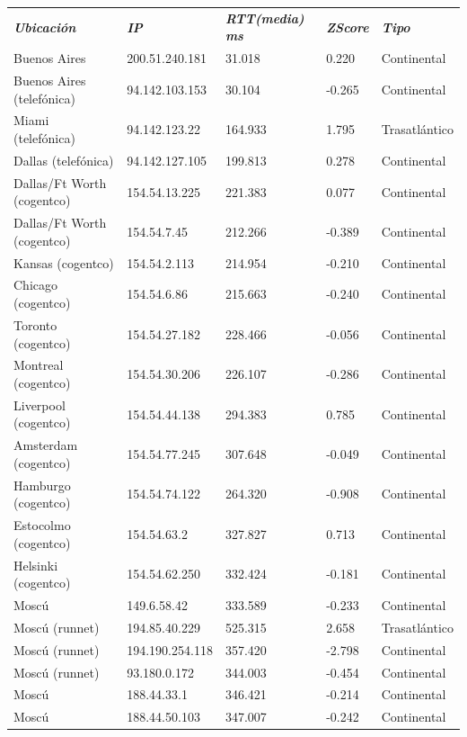 \begin{tabular}{lllll}

	\textit{\textbf{Ubicaci\'on}}	&	\textit{\textbf{IP}}	&	\textit{\textbf{RTT(media) ms}}	&	\textit{\textbf{ZScore}}	&	\textit{\textbf{Tipo}}	\\
	Buenos Aires			&	200.51.240.181	&	31.018	&	0.220	&	Continental	\\
	Buenos Aires (telef\'onica)	&	94.142.103.153	&	30.104	&	-0.265	&	Continental	\\
	Miami (telef\'onica)		&	94.142.123.22	&	164.933	&	1.795	&	Trasatl\'antico	\\
	Dallas (telef\'onica)		&	94.142.127.105	&	199.813	&	0.278	&	Continental	\\
	Dallas/Ft Worth (cogentco)	&	154.54.13.225	&	221.383	&	0.077	&	Continental	\\
	Dallas/Ft Worth (cogentco)	&	154.54.7.45	&	212.266	&	-0.389	&	Continental	\\
	Kansas (cogentco)		&	154.54.2.113	&	214.954	&	-0.210	&	Continental	\\
	Chicago (cogentco)		&	154.54.6.86	&	215.663	&	-0.240	&	Continental	\\
	Toronto (cogentco)		&	154.54.27.182	&	228.466	&	-0.056	&	Continental	\\
	Montreal (cogentco)		&	154.54.30.206	&	226.107	&	-0.286	&	Continental	\\
	Liverpool (cogentco)		&	154.54.44.138	&	294.383	&	0.785	&	Continental	\\
	Amsterdam (cogentco)		&	154.54.77.245	&	307.648	&	-0.049	&	Continental	\\
	Hamburgo (cogentco)		&	154.54.74.122	&	264.320	&	-0.908	&	Continental	\\
	Estocolmo (cogentco)		&	154.54.63.2	&	327.827	&	0.713	&	Continental	\\
	Helsinki (cogentco)		&	154.54.62.250	&	332.424	&	-0.181	&	Continental	\\
	Mosc\'u				&	149.6.58.42	&	333.589	&	-0.233	&	Continental	\\
	Mosc\'u (runnet)		&	194.85.40.229	&	525.315	&	2.658	&	Trasatl\'antico	\\
	Mosc\'u (runnet)		&	194.190.254.118	&	357.420	&	-2.798	&	Continental	\\
	Mosc\'u (runnet)		&	93.180.0.172	&	344.003	&	-0.454	&	Continental	\\
	Mosc\'u				&	188.44.33.1	&	346.421	&	-0.214	&	Continental	\\ 	
	Mosc\'u				&	188.44.50.103	&	347.007	&	-0.242	&	Continental	\\	

\end{tabular}

